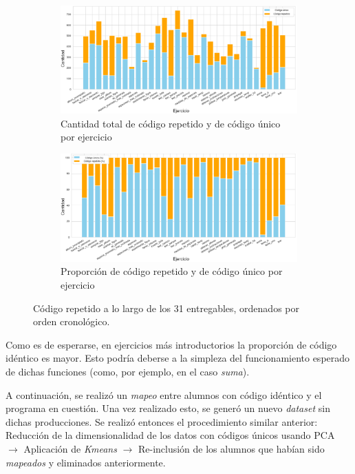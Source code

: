 \documentclass[11pt,a4paper,twoside,openany]{tesis}
\begin{document}
\begin{figure}[H]
    \centering
    \begin{subfigure}{0.45\textwidth}
        \includegraphics[width=\linewidth]{imagenes/unique-1.png}
        \caption{Cantidad total de código repetido y de código único por ejercicio}
        \label{fig:figura1}
    \end{subfigure}
    \hfill
    \begin{subfigure}{0.45\textwidth}
        \includegraphics[width=\linewidth]{imagenes/unique-2.png}
        \caption{Proporción de código repetido y de código único por ejercicio}
        \label{fig:figura2}
    \end{subfigure}
    \caption{Código repetido a lo largo de los 31 entregables, ordenados por orden cronológico.}
    \label{fig:figuras_juntas}
\end{figure}

Como es de esperarse, en ejercicios más introductorios la proporción de código idéntico es mayor. Esto podría deberse a la simpleza del funcionamiento esperado de dichas funciones (como, por ejemplo, en el caso \emph{suma}).

A continuación, se realizó un \emph{mapeo} entre alumnos con código idéntico y el programa en cuestión. Una vez realizado esto, se generó un nuevo \emph{dataset} sin dichas producciones. Se realizó entonces el procedimiento similar anterior: Reducción de la dimensionalidad de los datos con códigos únicos usando PCA $\rightarrow$ Aplicación de \emph{Kmeans} $\rightarrow$ Re-inclusión de los alumnos que habían sido \emph{mapeados} y eliminados anteriormente.
\end{document}
